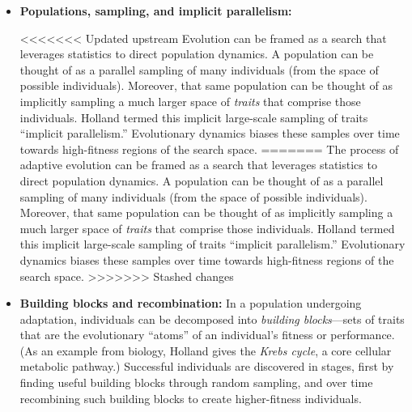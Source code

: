 \documentclass{sig-alternate}
\begin{document}
\begin{itemize}
\item{\bf Populations, sampling, and implicit parallelism:} 

<<<<<<< Updated upstream
  Evolution can be framed as a search that leverages statistics to
  direct population dynamics.  A population can be thought of as a
  parallel sampling of many individuals (from the space of possible
  individuals).  Moreover, that same population can be thought of as
  implicitly sampling a much larger space of \emph{traits} that
  comprise those individuals.  Holland termed this implicit
  large-scale sampling of traits ``implicit parallelism.''
  Evolutionary dynamics biases these samples over time towards
  high-fitness regions of the search space.
=======
  The process of adaptive evolution can be framed as a search that leverages
  statistics to direct population dynamics.  A
  population can be thought of as a parallel sampling of many
  individuals (from the space of possible individuals).  Moreover,
  that same population can be thought of as implicitly sampling a much
  larger space of \emph{traits} that comprise those individuals.
  Holland termed this implicit large-scale sampling of traits
  ``implicit parallelism.''  Evolutionary dynamics biases these
  samples over time towards high-fitness regions of the search space.
>>>>>>> Stashed changes


\item{\bf Building blocks and recombination:} 
  In a population undergoing adaptation,
  individuals can be decomposed into \emph{building blocks}---sets of
  traits that are the evolutionary ``atoms'' of an individual's
  fitness or performance. (As an example from biology, Holland gives
  the \emph{Krebs cycle}, a core cellular metabolic
  pathway.)   Successful individuals
  are discovered in stages, first by finding useful
  building blocks through random sampling, and over
  time recombining such building blocks to create higher-fitness individuals. 



\end{itemize}
\end{document}
